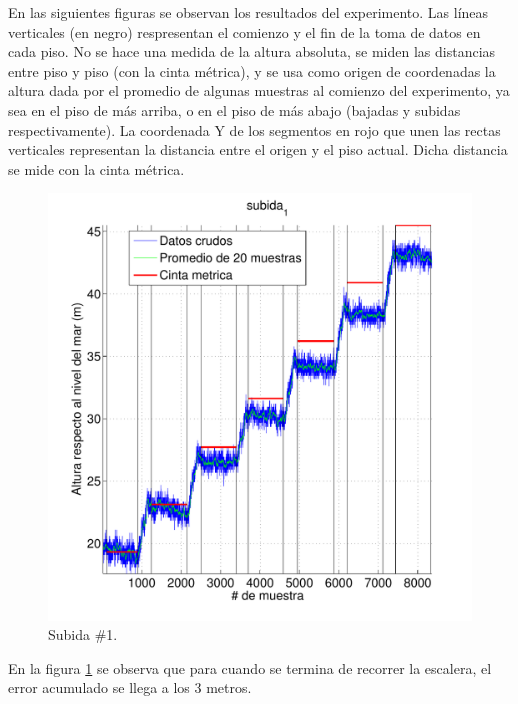 \documentclass[spanish,12pt,a4paper,titlepage]{report}
\begin{document}
En las siguientes figuras se observan los resultados del experimento. Las líneas verticales (en negro) respresentan el comienzo y el fin de la toma de datos en cada piso. No se hace una medida de la altura absoluta, se miden las distancias entre piso y piso (con la cinta métrica), y se usa como origen de coordenadas la altura dada por el promedio de algunas muestras al comienzo del experimento, ya sea en el piso de más arriba, o en el piso de más abajo (bajadas y subidas respectivamente). La coordenada Y de los segmentos en rojo que unen las rectas verticales representan la distancia entre el origen y el piso actual. Dicha distancia se mide con la cinta métrica.

\vspace{-12pt}
\begin{figure}[h!]
\centering
  \includegraphics[width=.80\textwidth]{./pics/metros-s1.pdf}
\vspace{-15pt}
  \caption{Subida \#1.}
  \label{fig:metros-s1.pdf}
\end{figure}
\vspace{-15pt}

En la figura \ref{fig:metros-s1.pdf} se observa que para cuando se termina de recorrer la escalera, el error acumulado se llega a los 3 metros.
\end{document}
